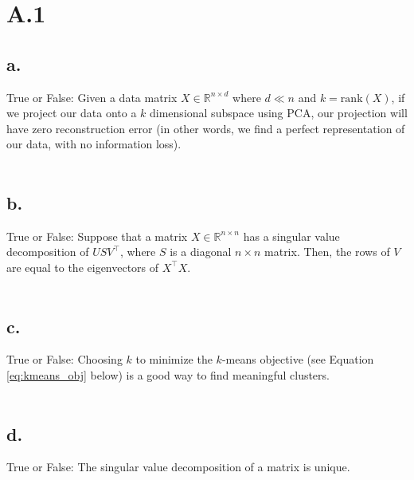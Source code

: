 \documentclass{article}
\date{{}}
\newcommand{\1}{\mathbf{1}}
\begin{document}
\thispagestyle{firstpageheader}

\section*{A.1}
{\Large 


\subsection*{a.}

True or False: Given a data matrix $X \in \mathbb{R}^{n \times d}$ where $d\ll n$ and $k = \mathrm{rank}(X)$, if we project our data onto a $k$ dimensional subspace using PCA, our projection will have zero reconstruction error (in other words, we find a perfect representation of our data, with no information loss). \\ \\



\subsection*{b.}

True or False: Suppose that a matrix $X\in \mathbb{R}^{n \times n}$ has a singular value decomposition of $USV^{\top}$, where $S$ is a diagonal $n \times n$ matrix. Then, the rows of $V$ are equal to the eigenvectors of $X^{\top}X$. \\ \\



\subsection*{c.}

True or False: Choosing $k$ to minimize the $k$-means objective (see Equation \eqref{eq:kmeans_obj} below) is a good way to find meaningful clusters. \\ \\



\subsection*{d.}

True or False: The singular value decomposition of a matrix is unique. \\ \\



}
\end{document}
